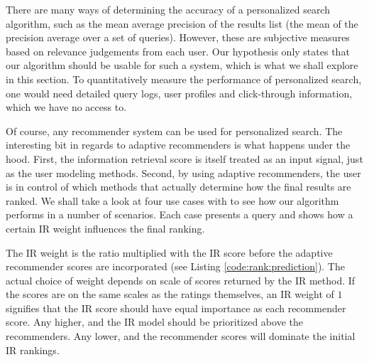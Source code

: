 \begin{comment}
\begin{table}[b]
  \centering
  \begin{tabular*}{0.7\textwidth}{ l l l l }
    \toprule
      ~ & 
      \emph{query} &
      \emph{scores} &
      \emph{IR weight} \\
    \midrule
    
    1 &
    ["new york or washington"] &
    combined &
    $1.0$ \\

    2 &
    [star trek] &
    combined &
    $0.3$ \\

    3 &
    [paris] &
    ratings &
    $0.0$ \\

    4 &
    [1998] &
    ratings &
    $0.0$ \\

    \bottomrule 
  \end{tabular*}
  \caption[List of Ranking Experiments]{List of ranking tests in this section.}
  \label{table:experiments:rank}
\end{table}
\end{comment}

There are many ways of determining the accuracy of a personalized search
algorithm, such as the mean average precision of the results list
(the mean of the precision average over a set of queries).
However, these are subjective measures based on relevance judgements from each user.
Our hypothesis only states that our algorithm should be usable for such 
a system, which is what we shall explore in this section.
To quantitatively measure the performance of personalized search,
one would need detailed query logs, user profiles and click-through information,
which we have no access to.

Of course, any recommender system can be used for personalized search.
The interesting bit in regards to adaptive recommenders is what 
happens under the hood. First, the information retrieval score 
is itself treated as an input signal, just as the user modeling methods.
Second, by using adaptive recommenders, the user is in control of which
methods that actually determine how the final results are ranked.
We shall take a look at four use cases with to see how our algorithm
performs in a number of scenarios. Each case presents 
a query and shows how a certain IR weight influences the final ranking.

The IR weight is the ratio multiplied with the IR score 
before the adaptive recommender scores are incorporated
(see Listing \ref{code:rank:prediction}).
The actual choice of weight depends on scale of scores
returned by the IR method.
If the scores are on the same scales as the ratings themselves,
an IR weight of $1$ signifies that the IR score
should have equal importance as each recommender score.
Any higher, and the IR model should be prioritized above the recommenders.
Any lower, and the recommender scores will dominate the initial IR rankings.

